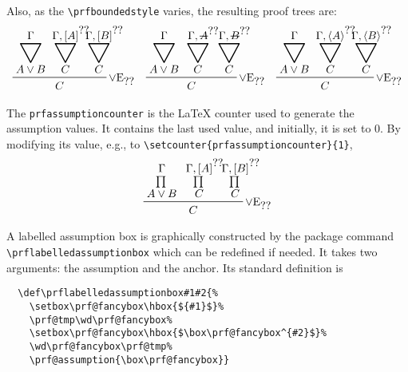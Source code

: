 \documentclass{amsart}
\begin{document}
Also, as the \verb|\prfboundedstyle| varies, the resulting proof trees
are: 
\begin{displaymath}
  \begin{array}{ccc}
    \begin{prfenv}
      \prfinterspace=.6em
      \prfboundedstyle=0
      \prfsummarystyle=4
      \prftree[r]{$\vee\mathrm{E}_{\prfref<assum:AorE>}$}
      {\prfsummary{\Gamma}{A \vee B}}
      {\prfsummary{\Gamma, 
          \prfboundedassumption<assum:AorE>{A}}{C}}
      {\prfsummary{\Gamma, 
          \prfboundedassumption<[l]assum:AorE>{B}}{C}}
      {C}
    \end{prfenv} &
    \begin{prfenv}
      \prfinterspace=.6em
      \prfboundedstyle=1
      \prfsummarystyle=4
      \prftree[r]{$\vee\mathrm{E}_{\prfref<assum:BorE>}$}
      {\prfsummary{\Gamma}{A \vee B}}
      {\prfsummary{\Gamma, 
          \prfboundedassumption<assum:BorE>{A}}{C}}
      {\prfsummary{\Gamma, 
          \prfboundedassumption<[l]assum:BorE>{B}}{C}}
      {C}
    \end{prfenv} &
    \begin{prfenv}
      \prfinterspace=.6em
      \prfboundedstyle=2
      \prfsummarystyle=4
      \prftree[r]{$\vee\mathrm{E}_{\prfref<assum:CorE>}$}
      {\prfsummary{\Gamma}{A \vee B}}
      {\prfsummary{\Gamma, 
          \prfboundedassumption<assum:CorE>{A}}{C}}
      {\prfsummary{\Gamma, 
          \prfboundedassumption<[l]assum:CorE>{B}}{C}}
      {C}
    \end{prfenv}
  \end{array}
\end{displaymath}

The \verb|prfassumptioncounter| is the \LaTeX{} counter used to
generate the assumption values. It contains the last used value, and
initially, it is set to $0$. By modifying its value, e.g., to
\verb|\setcounter{prfassumptioncounter}{1}|,
\begin{displaymath}
  \begin{prfenv}
    \setcounter{prfassumptioncounter}{1}
    \prfsummarystyle=2
    \prftree[r]{$\vee\mathrm{E}_{\prfref<assum:orEff>}$}
    {\prfsummary{\Gamma}{A \vee B}}
    {\prfsummary{\Gamma, 
        \prfboundedassumption<[f]assum:orEff>{A}}{C}}
    {\prfsummary{\Gamma, 
        \prfboundedassumption<[l]assum:orEff>{B}}{C}}
    {C}
  \end{prfenv}
\end{displaymath}

A labelled assumption box is graphically constructed by the package
command \verb|\prflabelledassumptionbox| which can be redefined if
needed. It takes two arguments: the assumption and the anchor. Its
standard definition is
\begin{verbatim}
  \def\prflabelledassumptionbox#1#2{%
    \setbox\prf@fancybox\hbox{${#1}$}%
    \prf@tmp\wd\prf@fancybox%
    \setbox\prf@fancybox\hbox{$\box\prf@fancybox^{#2}$}%
    \wd\prf@fancybox\prf@tmp%
    \prf@assumption{\box\prf@fancybox}}
\end{verbatim}
\end{document}
